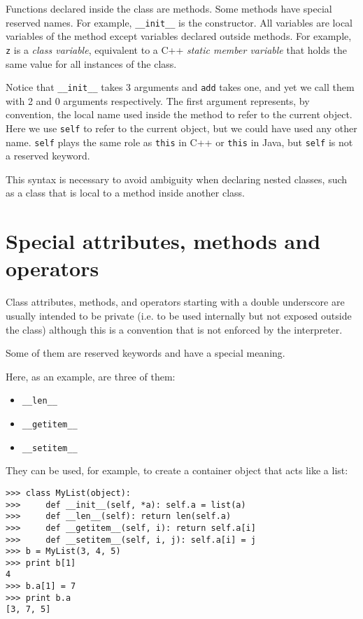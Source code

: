 \documentclass[justified,sixbynine,notoc]{tufte-book}
\def\ft{\small\tt}
\begin{document}
\begin{fullwidth}
Functions declared inside the class are methods. Some methods have special reserved names. For example, {\ft \_\_init\_\_} is the constructor. All variables are local variables of the method except variables declared outside methods. For example, {\ft z} is a {\it class variable}, equivalent to a C++ {\it static member variable} that holds the same value for all instances of the class.

Notice that {\ft \_\_init\_\_} takes 3 arguments and {\ft add} takes one, and yet we call them with 2 and 0 arguments respectively. The first argument represents, by convention, the local name used inside the method to refer to the current object. Here we use {\ft self} to refer to the current object, but we could have used any other name. {\ft self} plays the same role as {\ft *this} in C++ or {\ft this} in Java, but {\ft self} is not a reserved keyword.

This syntax is necessary to avoid ambiguity when declaring nested classes, such as a class that is local to a method inside another class.

\goodbreak\section{Special attributes, methods and operators}

Class attributes, methods, and operators starting with a double underscore are usually intended to be private (i.e. to be used internally but not exposed outside the class) although this is a convention that is not enforced by the interpreter.

Some of them are reserved keywords and have a special meaning.

Here, as an example, are three of them:
\begin{itemize}
\item {\ft \_\_len\_\_}

\item {\ft \_\_getitem\_\_}

\item {\ft \_\_setitem\_\_}
\end{itemize}
They can be used, for example, to create a container object that acts like a list:
\begin{lstlisting}
>>> class MyList(object):
>>>     def __init__(self, *a): self.a = list(a)
>>>     def __len__(self): return len(self.a)
>>>     def __getitem__(self, i): return self.a[i]
>>>     def __setitem__(self, i, j): self.a[i] = j
>>> b = MyList(3, 4, 5)
>>> print b[1]
4
>>> b.a[1] = 7
>>> print b.a
[3, 7, 5]
\end{lstlisting}


\end{fullwidth}
\end{document}
